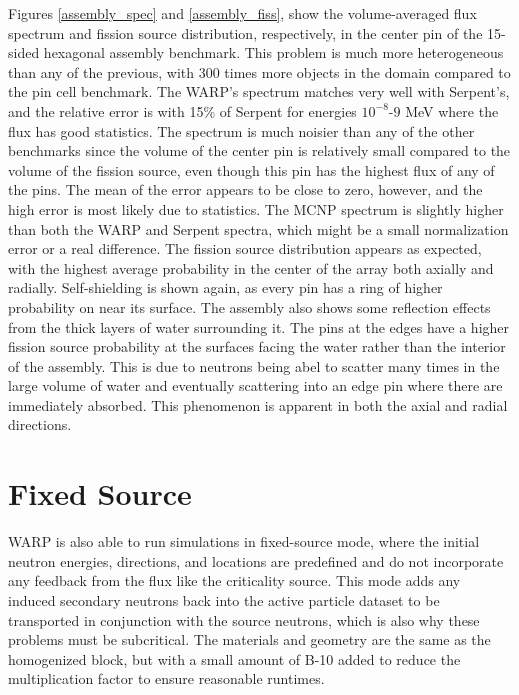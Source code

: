 Figures \ref{assembly_spec} and \ref{assembly_fiss}, show the volume-averaged flux spectrum and fission source distribution, respectively, in the center pin of the 15-sided hexagonal assembly benchmark.  This problem is much more heterogeneous than any of the previous, with 300 times more objects in the domain compared to the pin cell benchmark.  The WARP's spectrum matches very well with Serpent's, and the relative error is with 15\% of Serpent  for energies $10^{-8}$-$9$ MeV where the flux has good statistics.  The spectrum is much noisier than any of the other benchmarks since the volume of the center pin is relatively small compared to the volume of the fission source, even though this pin has the highest flux of any of the pins.  The mean of the error appears to be close to zero, however, and the high error is most likely due to statistics.  The MCNP spectrum is slightly higher than both the WARP and Serpent spectra, which might be a small normalization error or a real difference.  The fission source distribution appears as expected, with the highest average probability in the center of the array both axially and radially.  Self-shielding is shown again, as every pin has a ring of higher probability on near its surface.  The assembly also shows some reflection effects from the thick layers of water surrounding it.  The pins at the edges have a higher fission source probability at the surfaces facing the water rather than the interior of the assembly.  This is due to neutrons being abel to scatter many times in the large volume of water and eventually scattering into an edge pin where there are immediately absorbed.  This phenomenon is apparent in both the axial and radial directions.


\section{Fixed Source}

WARP is also able to run simulations in fixed-source mode, where the initial neutron energies, directions, and locations are predefined and do not incorporate any feedback from the flux like the criticality source.  This mode adds any induced secondary neutrons back into the active particle dataset to be transported in conjunction with the source neutrons, which is also why these problems must be subcritical.  The materials and geometry are the same as the homogenized block, but with a small amount of B-10 added to reduce the multiplication factor to ensure reasonable runtimes.

